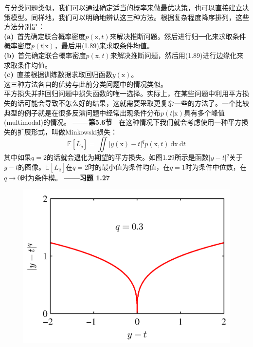 \documentclass[b5paper]{book}
\numberwithin{equation}{chapter}
\begin{document}
{	\indent 与分类问题类似，我们可以通过确定适当的概率来做最优决策，也可以直接建立决策模型。同样地，我们可以明确地辨认这三种方法。根据复杂程度降序排列，这些方法分别是：\\
	\textbf{(a)}\ 首先确定联合概率密度$p(\boldsymbol{\mathrm{x}},t)$来解决推断问题。然后进行归一化来求取条件概率密度$p(t|\boldsymbol{\mathrm{x}})$，最后用(1.89)来求取条件均值。\\
	\textbf{(b)}\ 首先确定联合概率密度$p(\boldsymbol{\mathrm{x}},t)$来解决推断问题，然后用(1.89)进行边缘化来求取条件均值。\\
	\textbf{(c)}\ 直接根据训练数据求取回归函数$y(\boldsymbol{\mathrm{x}})$。\\
	\indent 这三种方法各自的优势与此前分类问题中的情况类似。\\
	\indent 平方损失并非回归问题中损失函数的唯一选择。实际上，在某些问题中利用平方损失的话可能会导致不怎么好的结果，这就需要采取更复杂一些的方法了。一个比较典型的例子就是在很多反演问题中经常出现条件分布$p(t|\boldsymbol{\mathrm{x}})$具有多个峰值(multimodal)的情况。\color{red} \textbf{——第5.6节}　\color{black}在这种情况下我们就会考虑使用一种平方损失的扩展形式，叫做Minkowski损失：
	\begin{equation}
		\mathbb{E}[L_q]=\iint |y(\boldsymbol{\mathrm{x}})-t|^q p(\boldsymbol{\mathrm{x}},t)\ \mathrm{d}\boldsymbol{\mathrm{x}}\ \mathrm{d}t
	\end{equation}
	其中如果$q=2$的话就会退化为期望的平方损失。如图1.29所示是函数$|y-t|^q$关于$y-t$的图像。$\mathbb{E}[L_q]$在$q=2$时的最小值为条件均值，在$q=1$时为条件中位数，在$q \rightarrow 0$时为条件模。\color{red} \textbf{——习题 1.27}　\color{black}
	\begin{figure}[ht]
		\begin{minipage}[t]{0.5\linewidth}
		\includegraphics[scale=0.8]{Images/1-29a.png}

\end{minipage}
\end{figure}}
\end{document}
